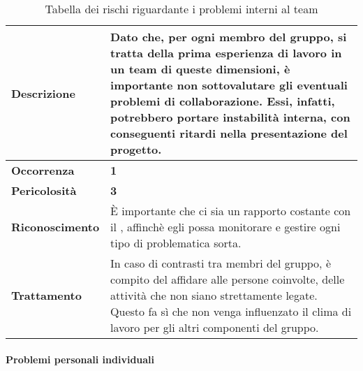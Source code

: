 \begin{table}[H]
	\begin{center}
		\begin{tabular}{|l | p{11cm}|}
			\hline
			\textbf{Descrizione}	& Dato che, per ogni membro del gruppo, si tratta della prima esperienza di lavoro in un team di queste dimensioni, è importante non sottovalutare gli eventuali problemi di collaborazione. Essi, infatti, potrebbero portare instabilità interna, con conseguenti ritardi nella presentazione del progetto. \\
			\hline
			\textbf{Occorrenza}	&	\textbf{1}	\\
			\hline
			\textbf{Pericolosità}	&	\textbf{3}	\\
			\hline
			\textbf{Riconoscimento}	& \MakeUppercase{è} importante che ci sia un rapporto costante con il \textit{\RdP}, affinchè egli possa monitorare e gestire ogni tipo di problematica sorta.	\\
			\hline
			\textbf{Trattamento}	&	In caso di contrasti tra membri del gruppo, è compito del \textit{\RdP} affidare alle persone coinvolte, delle attività che non siano strettamente legate. Questo fa sì che non venga influenzato il clima di lavoro per gli altri componenti del gruppo.	\\
			\hline
		\end{tabular}
		\caption{Tabella dei rischi riguardante i problemi interni al team}
	\end{center}
\end{table}

\paragraph{Problemi personali individuali}

